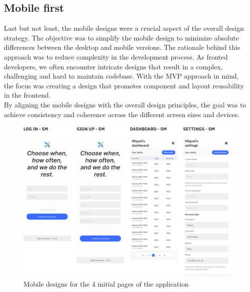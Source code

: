 \documentclass[./memory.tex]{subfiles}
\begin{document}
\subsection{Mobile first}
Last but not least, the mobile designs were a crucial aspect of the overall
design strategy. The objective was to simplify the mobile design to minimize
absolute differences between the desktop and mobile versions. The rationale
behind this approach was to reduce complexity in the development process. As
fronted developers, we often encounter intricate designs that result in a
complex, challenging and hard to maintain codebase. With the MVP approach in
mind, the focus was creating a design that promotes component and layout
reusability in the frontend.
\\[8pt]
By aligning the mobile designs with the overall design principles, the goal was
to achieve consistency and coherence across the different screen sizes and
devices.
\begin{figure}[H]
	\centering
	\includegraphics[width=\textwidth]{./assets/designs/design-sm.png}
	\caption{Mobile designs for the 4 initial pages of the application}
\end{figure}
\end{document}
